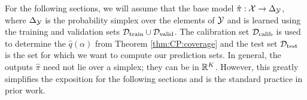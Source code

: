 %
For the following sections, we will assume that the base model $\hat{\pi}: {\mathcal{X}} \to \Delta_{{\mathcal{Y}}}$, where $\Delta_{{\mathcal{Y}}}$ is the probability simplex over the elements of ${\mathcal{Y}}$ and is learned using the training and validation sets $\mathcal{D_{\mathrm{train}}} \cup \mathcal{D_{\mathrm{valid}}}$. 
The calibration set $\mathcal{D_{\mathrm{calib}}}$ is used to determine the $\hat{q}(\alpha)$ from Theorem \ref{thm:CP:coverage} and the test set $\mathcal{D_{\mathrm{test}}}$ is the set for which we want to compute our prediction sets.
In general, the outputs $\hat{\pi}$ need not lie over a simplex; they can be in $\mathbb{R}^K$.
However, this greatly simplifies the exposition for the following sections and is the standard practice in prior work.

